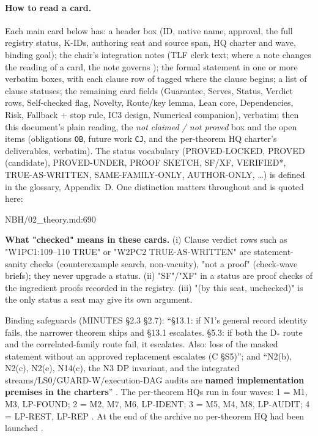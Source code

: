 \paragraph{How to read a card.} Each main card below has: a header box (ID, native name, approval, the full registry status, K-IDs, authoring seat and source span, HQ charter and wave, binding goal); the chair's integration notes (TLF clerk text; where a note changes the reading of a card, the note governs ); the formal statement in one or more verbatim boxes, with each clause row of  tagged where the clause begins; a list of clause statuses; the remaining card fields (Guarantee, Serves, Status, Verdict rows, Self-checked flag, Novelty, Route/key lemma, Lean core, Dependencies, Risk, Fallback + stop rule, IC3 design, Numerical companion), verbatim; then this document's plain reading, the \emph{not claimed / not proved} box and the open items (obligations \texttt{OB}, future work \texttt{CJ}, and the per-theorem HQ charter's deliverables, verbatim). The status vocabulary (PROVED-LOCKED, PROVED (candidate), PROVED-UNDER, PROOF SKETCH, SF/XF, VERIFIED*, TRUE-AS-WRITTEN, SAME-FAMILY-ONLY, AUTHOR-ONLY, \ldots) is defined in the glossary, Appendix~D. One distinction matters throughout and is quoted here:

\begin{stmt}{NBH/02_theory.md:690}
\par\noindent \textbf{What "checked" means in these cards.} (i) Clause verdict rows such as "W1PC1:109–110 TRUE" or "W2PC2 TRUE-AS-WRITTEN" are statement-sanity checks (counterexample search, non-vacuity), "not a proof" (check-wave briefs); they never upgrade a status. (ii) "SF"/"XF" in a status are proof checks of the ingredient proofs recorded in the registry. (iii) "(by this seat, unchecked)" is the only status a seat may give its own argument.
\end{stmt}

Binding safeguards (MINUTES §2.3 §2.7): ``§13.1: if N1's general record identity fails, the narrower theorem ships and §13.1 escalates. §5.3: if both the D$_{*}$ route and the correlated-family route fail, it escalates. Also: loss of the masked statement without an approved replacement escalates (C §S5)''; and ``N2(b), N2(c), N2(e), N14(c), the N3 DP invariant, and the integrated streams/LS0/GUARD-W/execution-DAG audits are \textbf{named implementation premises in the charters}'' . The per-theorem HQs run in four waves: 1 = M1, M3, LP-FOUND; 2 = M2, M7, M6, LP-IDENT; 3 = M5, M4, M8, LP-AUDIT; 4 = LP-REST, LP-REP . At the end of the archive no per-theorem HQ had been launched .

